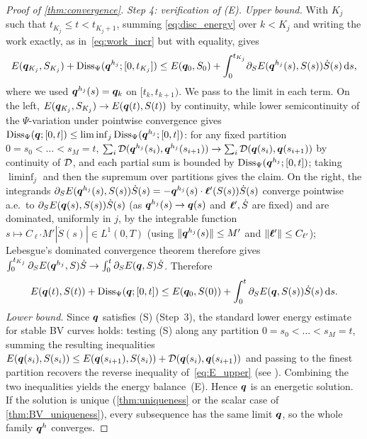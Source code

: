 \begin{proof}[Proof of \cref{thm:convergence}]
\emph{Step 4: verification of \textnormal{(E)}.} \textit{Upper bound.}
With $K_j$ such that $t_{K_j}\le t<t_{K_j+1}$, summing
\eqref{eq:disc_energy} over $k<K_j$ and writing the work exactly, as
in~\eqref{eq:work_incr} but with equality, gives
\begin{equation}\label{eq:summed_exact}
  E(\bm{q}_{K_j},S_{K_j})+\mathrm{Diss}_\Psi(\bm{q}^{h_j};[0,t_{K_j}])
  \le E(\bm{q}_0,S_0)+\int_0^{t_{K_j}}\!\partial_S E(\bm{q}^{h_j}(s),S(s))\dot S(s)\mathop{}\!\mathrm{d} s,
\end{equation}
where we used $\bm{q}^{h_j}(s)=\bm{q}_k$ on $[t_k,t_{k+1})$. We pass to the
limit in each term. On the left, $E(\bm{q}_{K_j},S_{K_j})\to E(\bm{q}(t),S(t))$
by continuity, while lower semicontinuity of the $\Psi$-variation under
pointwise convergence gives
$\mathrm{Diss}_\Psi(\bm{q};[0,t])\le\liminf_j\mathrm{Diss}_\Psi(\bm{q}^{h_j};[0,t])$: for
any fixed partition $0=s_0<\dots<s_M=t$,
$\sum_i\mathcal{D}(\bm{q}^{h_j}(s_i),\bm{q}^{h_j}(s_{i+1}))\to\sum_i\mathcal{D}(\bm{q}(s_i),\bm{q}(s_{i+1}))$
by continuity of $\mathcal{D}$, and each partial sum is bounded by
$\mathrm{Diss}_\Psi(\bm{q}^{h_j};[0,t])$; taking $\liminf_j$ and then the
supremum over partitions gives the claim. On the right, the integrands
$\partial_S E(\bm{q}^{h_j}(s),S(s))\dot S(s)=-\bm{q}^{h_j}(s)\cdot\bm{\ell}'(S(s))\dot S(s)$
converge pointwise a.e.\ to $\partial_S E(\bm{q}(s),S(s))\dot S(s)$ (as
$\bm{q}^{h_j}(s)\to\bm{q}(s)$ and $\bm{\ell}',\dot S$ are fixed) and are
dominated, uniformly in $j$, by the integrable function
$s\mapsto C_{\ell'}M'|\dot S(s)|\in L^1(0,T)$ (using
$\|\bm{q}^{h_j}(s)\|\le M'$ and $\|\bm{\ell}'\|\le C_{\ell'}$); Lebesgue's
dominated convergence theorem therefore gives
$\int_0^{t_{K_j}}\partial_S E(\bm{q}^{h_j},S)\dot S\to\int_0^t\partial_S E(\bm{q},S)\dot S$.
Therefore
\begin{equation}\label{eq:E_upper}
  E(\bm{q}(t),S(t))+\mathrm{Diss}_\Psi(\bm{q};[0,t])
  \le E(\bm{q}_0,S(0))+\int_0^t\partial_S E(\bm{q},S(s))\dot S(s)\mathop{}\!\mathrm{d} s .
\end{equation}
\textit{Lower bound.} Since $\bm{q}$ satisfies (S) (Step~3), the standard
lower energy estimate for stable BV curves holds: testing (S) along any
partition $0=s_0<\dots<s_M=t$, summing the resulting inequalities
$E(\bm{q}(s_{i}),S(s_i))\le E(\bm{q}(s_{i+1}),S(s_i))+\mathcal{D}(\bm{q}(s_{i}),\bm{q}(s_{i+1}))$
and passing to the finest partition recovers the reverse inequality
of~\eqref{eq:E_upper} (see \cite[Sec.~2.1]{MielkeRoubicek}).
Combining the two inequalities yields the energy balance~(E). Hence
$\bm{q}$ is an energetic solution. If the solution is unique
(\cref{thm:uniqueness} or the scalar case of \cref{thm:BV_uniqueness}),
every subsequence has the same limit $\bm{q}$, so the whole family
$\bm{q}^h$ converges.
\end{proof}


